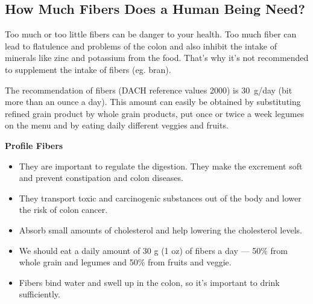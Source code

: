 \documentclass[../main.tex]{subfiles}
\begin{document}


  \subsection{How Much Fibers Does a Human Being Need?}

  Too much or too little fibers can be danger to your health.
  Too much fiber can lead to flatulence and problems of the colon
  and also inhibit the intake of minerals like zinc and potassium from the food.
  That's why it's not recommended to supplement the intake of fibers (eg. bran).

  The recommendation of fibers (DACH reference values 2000) is 30~g/day (bit more than an ounce a day).
  This amount can easily be obtained by substituting refined grain product by whole grain products,
  put once or twice a week legumes on the menu and by eating daily different veggies and fruits.

  
\vspace{5mm}
\noindent
\begin{fminipage}{\textwidth}
  \textbf{Profile Fibers}
  \begin{itemize}
  \item They are important to regulate the digestion.
    They make the excrement soft and prevent constipation and colon diseases.
  \item They transport toxic and carcinogenic substances out of the body and lower the risk of colon cancer.
    \item Absorb small amounts of cholesterol and help lowering the cholesterol levels.
    \item We should eat a daily amount of 30 g (1 oz) of fibers a day ---
      50\% from whole grain and legumes and 50\% from fruits and veggie.
      \item Fibers bind water and swell up in the colon, so it's important to drink sufficiently.
  \end{itemize}
\end{fminipage}

\end{document}
